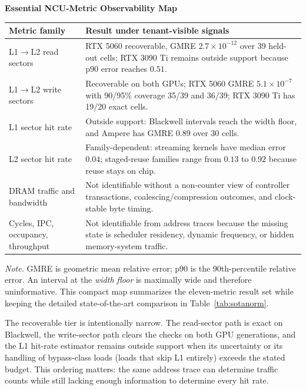 \documentclass[conference]{IEEEtran}
\begin{document}
\medskip
\noindent\begin{minipage}{\columnwidth}
\centering
\textbf{\footnotesize Essential NCU-Metric Observability Map}\\[-1pt]
\setlength{\tabcolsep}{2pt}
\renewcommand{\arraystretch}{1.04}
\fontsize{5.9}{6.55}\selectfont
\begin{tabular*}{\columnwidth}{@{\extracolsep{\fill}}>{\raggedright\arraybackslash}p{2.15cm}>{\raggedright\arraybackslash}p{5.35cm}@{}}
\toprule
\textbf{Metric family} & \textbf{Result under tenant-visible signals} \\
\midrule
L1$\rightarrow$L2 read sectors &
RTX 5060 recoverable, GMRE $2.7{\times}10^{-12}$ over 39 held-out cells;
RTX 3090 Ti remains outside support because p90 error reaches $0.51$.\\
L1$\rightarrow$L2 write sectors &
Recoverable on both GPUs; RTX 5060 GMRE $5.1{\times}10^{-7}$ with 90/95\%
coverage 35/39 and 36/39; RTX 3090 Ti has 19/20 exact cells.\\
L1 sector hit rate &
Outside support: Blackwell intervals reach the width floor, and Ampere has
GMRE $0.89$ over 30 cells.\\
L2 sector hit rate &
Family-dependent: streaming kernels have median error $0.04$; staged-reuse
families range from $0.13$ to $0.92$ because reuse stays on chip.\\
DRAM traffic and bandwidth &
Not identifiable without a non-counter view of controller transactions,
coalescing/compression outcomes, and clock-stable byte timing.\\
Cycles, IPC, occupancy, throughput &
Not identifiable from address traces because the missing state is scheduler
residency, dynamic frequency, or hidden memory-system traffic.\\
\bottomrule
\end{tabular*}
\vspace{3pt}
\begin{minipage}{\columnwidth}
\raggedright
\fontsize{5.6}{6.2}\selectfont
\emph{Note.} GMRE is geometric mean relative error; p90 is the 90th-percentile
relative error. An interval at the \emph{width floor} is maximally wide and
therefore uninformative. This compact map summarizes the eleven-metric result
set while keeping the detailed state-of-the-art comparison in
Table~\ref{tab:sotanorm}.
\end{minipage}
\end{minipage}
\medskip

The recoverable tier is intentionally narrow. The read-sector path is exact on
Blackwell, the write-sector path clears the checks on both GPU generations, and
the L1 hit-rate estimator remains outside support when its uncertainty or its
handling of bypass-class loads (loads that skip L1 entirely) exceeds the
stated budget. This ordering matters: the
same address trace can determine traffic counts while still lacking enough
information to determine every hit rate.
\end{document}
